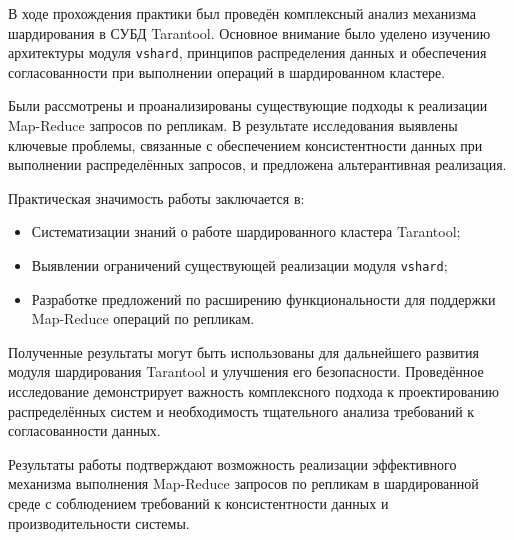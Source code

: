 \conclusion

В ходе прохождения практики был проведён комплексный анализ механизма
шардирования в СУБД Tarantool. Основное внимание было уделено изучению
архитектуры модуля \texttt{vshard}, принципов распределения данных и
обеспечения согласованности при выполнении операций в шардированном кластере.

Были рассмотрены и проанализированы существующие подходы к реализации
Map-Reduce запросов по репликам. В результате исследования выявлены ключевые
проблемы, связанные с обеспечением консистентности данных при выполнении
распределённых запросов, и предложена альтерантивная реализация.

Практическая значимость работы заключается в:
\begin{itemize}
    \item Систематизации знаний о работе шардированного кластера Tarantool;
    \item Выявлении ограничений существующей реализации модуля \texttt{vshard};
    \item Разработке предложений по расширению функциональности для поддержки
        Map-Reduce операций по репликам.
\end{itemize}

Полученные результаты могут быть использованы для дальнейшего развития модуля
шардирования Tarantool и улучшения его безопасности. Проведённое исследование
демонстрирует важность комплексного подхода к проектированию распределённых
систем и необходимость тщательного анализа требований к согласованности данных.

Результаты работы подтверждают возможность реализации эффективного механизма
выполнения Map-Reduce запросов по репликам в шардированной среде с соблюдением
требований к консистентности данных и производительности системы.

